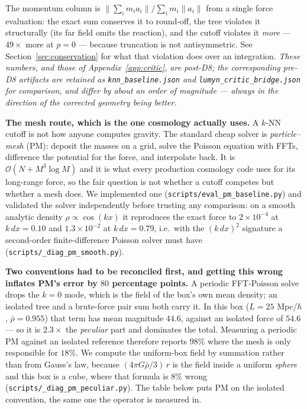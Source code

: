 \noindent The momentum column is $\|\sum_i m_i a_i\| / \sum_i m_i\|a_i\|$ from a single force
evaluation: the exact sum conserves it to round-off, the tree violates it structurally (its far field
omits the reaction), and the cutoff violates it \emph{more} --- $49\times$ more at $p{=}0$ --- because
truncation is not antisymmetric. See Section~\ref{sec:conservation} for what that violation does over
an integration. \emph{These numbers, and those of Appendix~\ref{app:critic}, are post-D8; the
corresponding pre-D8 artifacts are retained as \texttt{knn\_\allowbreak baseline.\allowbreak json} and
\texttt{lumyn\_\allowbreak critic\_\allowbreak bridge.\allowbreak json} for comparison, and differ by about an order of magnitude ---
always in the direction of the corrected geometry being better.}


\noindent\textbf{The mesh route, which is the one cosmology actually uses.} A $k$-NN cutoff is not how
anyone computes gravity. The standard cheap solver is \emph{particle--mesh} (PM): deposit the masses on
a grid, solve the Poisson equation with FFTs, difference the potential for the force, and interpolate
back. It is $\mathcal{O}(N + M^3\log M)$ and it is what every production cosmology code uses for its
long-range force, so the fair question is not whether a cutoff competes but whether a mesh does.
We implemented one (\texttt{scripts/\allowbreak eval\_\allowbreak pm\_\allowbreak baseline.\allowbreak py}) and validated the solver independently
before trusting any comparison: on a smooth analytic density $\rho\propto\cos(kx)$ it reproduces the
exact force to $2\times10^{-4}$ at $k\,dx=0.10$ and $1.3\times10^{-2}$ at $k\,dx=0.79$, i.e.\ with the
$(k\,dx)^2$ signature a second-order finite-difference Poisson solver must have
(\texttt{scripts/\allowbreak \_\allowbreak diag\_\allowbreak pm\_\allowbreak smooth.\allowbreak py}).

\textbf{Two conventions had to be reconciled first, and getting this wrong inflates PM's error by
$80$ percentage points.} A periodic FFT-Poisson solve drops the $k{=}0$ mode, which is the field of
the box's own mean density; an isolated tree and a brute-force pair sum both carry it. In this box
($L=25$ Mpc/$h$, $\bar\rho=0.955$) that term has mean magnitude $44.6$, against an isolated force of
$54.6$ --- so it is $2.3\times$ the \emph{peculiar} part and dominates the total. Measuring a periodic
PM against an isolated reference therefore reports $98\%$ where the mesh is only responsible for
$18\%$. We compute the uniform-box field by summation rather than from Gauss's law, because
$(4\pi G\bar\rho/3)\,r$ is the field inside a uniform \emph{sphere} and this box is a cube, where that
formula is $8\%$ wrong (\texttt{scripts/\allowbreak \_\allowbreak diag\_\allowbreak pm\_\allowbreak peculiar.\allowbreak py}). The table below puts PM on the
isolated convention, the same one the operator is measured in.

